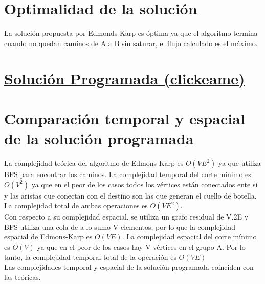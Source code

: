 \section{Optimalidad de la solución}
La solución propuesta por Edmonds-Karp es óptima ya que el algoritmo termina cuando no quedan caminos de A a B sin saturar, el flujo calculado es el máximo. 

\section{\href{https://github.com/ilitteri/7529-TDA-1/blob/master/tp3/README.md}{Solución Programada (clickeame)}}

\section{Comparación temporal y espacial de la solución programada}
La complejidad teórica del algoritmo de Edmons-Karp es $O(VE^2)$ ya que utiliza BFS para encontrar los caminos. La complejidad temporal del corte mínimo es $O(V^2)$ ya que en el peor de los casos todos los vértices están conectados ente sí y las aristas que conectan con el destino son las que generan el cuello de botella. La complejidad total de ambas operaciones es $O(VE^2)$. \\

Con respecto a su complejidad espacial, se utiliza un grafo residual de V.2E y BFS utiliza una cola de a lo sumo V elementos, por lo que la complejidad espacial de Edmons-Karp es $O(VE)$. La complejidad espacial del corte mínimo es $O(V)$ ya que en el peor de los casos hay V vértices en el grupo A. Por lo tanto, la complejidad temporal total de la operación es $O(VE)$ \\

Las complejidades temporal y espacial de la solución programada coinciden con las teóricas.